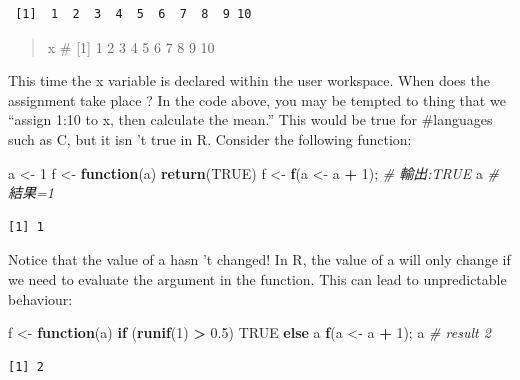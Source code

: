 \documentclass[]{book}
\newenvironment{Shaded}{\begin{snugshade}}{\end{snugshade}}
\newcommand{\CommentTok}[1]{\textcolor[rgb]{0.56,0.35,0.01}{\textit{#1}}}
\newcommand{\ControlFlowTok}[1]{\textcolor[rgb]{0.13,0.29,0.53}{\textbf{#1}}}
\newcommand{\DecValTok}[1]{\textcolor[rgb]{0.00,0.00,0.81}{#1}}
\newcommand{\FloatTok}[1]{\textcolor[rgb]{0.00,0.00,0.81}{#1}}
\newcommand{\KeywordTok}[1]{\textcolor[rgb]{0.13,0.29,0.53}{\textbf{#1}}}
\newcommand{\NormalTok}[1]{#1}
\newcommand{\OperatorTok}[1]{\textcolor[rgb]{0.81,0.36,0.00}{\textbf{#1}}}
\newcommand{\OtherTok}[1]{\textcolor[rgb]{0.56,0.35,0.01}{#1}}
\newcommand{\StringTok}[1]{\textcolor[rgb]{0.31,0.60,0.02}{#1}}
\theoremstyle{definition}
\theoremstyle{definition}
\theoremstyle{definition}
\theoremstyle{remark}
\begin{document}
\begin{verbatim}
 [1]  1  2  3  4  5  6  7  8  9 10
\end{verbatim}

\begin{quote}
x \# {[}1{]} 1 2 3 4 5 6 7 8 9 10
\end{quote}

This time the x variable is declared within the user workspace. When
does the assignment take place ? In the code above, you may be tempted
to thing that we ``assign 1:10 to x, then calculate the mean.'' This
would be true for \#languages such as C, but it isn 't true in R.
Consider the following function:

\begin{Shaded}
\begin{Highlighting}[]
\NormalTok{a <-}\StringTok{ }\DecValTok{1}
\NormalTok{f <-}\StringTok{ }\ControlFlowTok{function}\NormalTok{(a) }\KeywordTok{return}\NormalTok{(}\OtherTok{TRUE}\NormalTok{)}
\NormalTok{f <-}\StringTok{ }\KeywordTok{f}\NormalTok{(a <-}\StringTok{ }\NormalTok{a }\OperatorTok{+}\StringTok{ }\DecValTok{1}\NormalTok{);}
\CommentTok{# 輸出:TRUE}
\NormalTok{a }\CommentTok{# 結果=1 }
\end{Highlighting}
\end{Shaded}

\begin{verbatim}
[1] 1
\end{verbatim}

Notice that the value of a hasn 't changed! In R, the value of a will
only change if we need to evaluate the argument in the function. This
can lead to unpredictable behaviour:

\begin{Shaded}
\begin{Highlighting}[]
\NormalTok{f <-}\StringTok{ }\ControlFlowTok{function}\NormalTok{(a) }\ControlFlowTok{if}\NormalTok{ (}\KeywordTok{runif}\NormalTok{(}\DecValTok{1}\NormalTok{) }\OperatorTok{>}\StringTok{ }\FloatTok{0.5}\NormalTok{) }\OtherTok{TRUE} \ControlFlowTok{else}\NormalTok{ a}
    \KeywordTok{f}\NormalTok{(a <-}\StringTok{ }\NormalTok{a }\OperatorTok{+}\StringTok{ }\DecValTok{1}\NormalTok{);}
\NormalTok{a }\CommentTok{# result 2}
\end{Highlighting}
\end{Shaded}

\begin{verbatim}
[1] 2
\end{verbatim}
\end{document}
